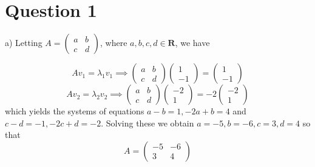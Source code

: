 \documentclass[12pt]{article}
\renewcommand{\=}[1]{\stackrel{#1}{=}} %
\theoremstyle{definition}
\begin{document}
\section*{Question 1}\LARGE\pagestyle{empty}
a) Letting $A = \begin{pmatrix}
    a &b\\
    c & d
\end{pmatrix}$, where $a,b,c,d \in \textbf{R}$, we have

$$Av_1 = \lambda_1v_1 \implies \begin{pmatrix}
    a & b\\
    c & d
\end{pmatrix}\begin{pmatrix}
    1\\
    -1
\end{pmatrix}=\begin{pmatrix}
    1\\
    -1
\end{pmatrix}$$$$Av_2 = \lambda_2v_2 \implies \begin{pmatrix}
    a & b\\
    c & d
\end{pmatrix}\begin{pmatrix}
    -2\\
    1
\end{pmatrix}=-2\begin{pmatrix}
    -2\\
    1
\end{pmatrix}$$
which yields the systems of equations $a - b = 1, -2a + b = 4$ and $c - d = -1, -2c + d = -2$. Solving these we obtain $a = -5, b = -6, c = 3, d = 4$ so that $$A = \begin{pmatrix}
    -5 &-6\\
    3 & 4
\end{pmatrix}$$
\end{document}
